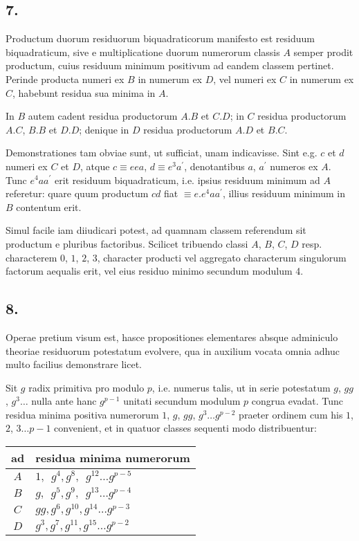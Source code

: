 \documentclass[twoside,12pt, showframe]{memoir}
\begin{document}
\subsection*{7.}
 
Productum duorum residuorum biquadraticorum manifesto est residuum biquadraticum, sive e multiplicatione duorum numerorum classis \(A\) semper prodit productum, cuius residuum minimum positivum ad eandem classem pertinet. Perinde producta numeri ex \(B\) in numerum ex \(D\), vel numeri ex \(C\) in numerum ex \(C\), habebunt residua sua minima in \(A\).
 
In \(B\) autem cadent residua productorum \(A . B\) et \(C . D\); in \(C\) residua productorum \(A . C\), \(B . B\) et \(D . D\); denique in \(D\) residua productorum \(A . D\) et \(B . C\).
 
Demonstrationes tam obviae sunt, ut sufficiat, unam indicavisse. Sint e.g. \(c\) et \(d\) numeri ex \(C\) et \(D\), atque \(c \equiv e e a\), \(d \equiv e^{3} a^{\prime}\), denotantibus \(a\), \(a^{\prime}\) numeros ex \(A\). Tunc \(e^{4} a a^{\prime}\) erit residuum biquadraticum, i.e. ipsius residuum minimum ad \(A\) referetur: quare quum productum \(c d\) fiat \(\equiv e . e^{4} a a^{\prime}\), illius residuum minimum in \(B\) contentum erit.
 
Simul facile iam diiudicari potest, ad quamnam classem referendum sit productum e pluribus factoribus. Scilicet tribuendo classi \(A\), \(B\), \(C\), \(D\) resp. characterem \(0\), \(1\), \(2\), \(3\), character producti vel aggregato characterum singulorum factorum aequalis erit, vel eius residuo minimo secundum modulum 4.

\subsection*{8.}
 
Operae pretium visum est, hasce propositiones elementares absque adminiculo theoriae residuorum potestatum evolvere, qua in auxilium vocata omnia adhuc multo facilius demonstrare licet.
 
Sit \(g\) radix primitiva pro modulo \(p\), i.e. numerus talis, ut in serie potestatum \(g\), \(g g\), \(g^{3} \ldots\) nulla ante hanc \(g^{p-1}\) unitati secundum modulum \(p\) congrua evadat. Tunc residua minima positiva numerorum \(1\), \(g\), \(g g\), \(g^{3} \ldots g^{p-2}\) praeter ordinem cum his \(1\), \(2\), \(3 \ldots p-1\) convenient, et in quatuor classes sequenti modo distribuentur:\clearpage\noindent%
\begin{center}
\begin{tabular}{c|l}
ad & residua minima numerorum \\
\hline
\(A\) & \(1,\phantom{g} g^{4}, g^{8}, \phantom{g}g^{12} \ldots g^{p-5}\) \\
\(B\) & \(g,\phantom{g} g^{5}, g^{9}, \phantom{g}g^{13} \ldots g^{p-4}\) \\
\(C\) & \(g g, g^{6}, g^{10}, g^{14} \ldots g^{p-3}\) \\
\(D\) & \(g^{3}, g^{7}, g^{11}, g^{15} \ldots g^{p-2}\) \\
\end{tabular}
\end{center}
 
\end{document}
